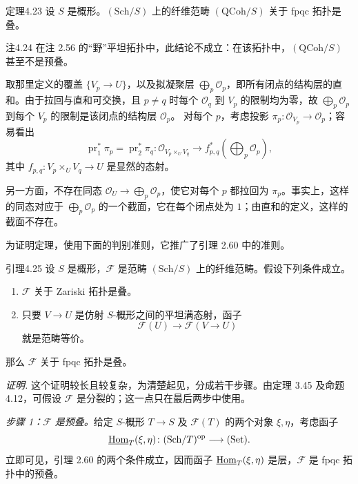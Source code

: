 \begin{origstatement}{定理}{4.23}\label{ch04:thm423}
设 $S$ 是概形。$(\mathrm{Sch}/S)$ 上的纤维范畴 $(\mathrm{QCoh}/S)$ 关于 fpqc 拓扑是叠。
\end{origstatement}

\begin{origstatement}{注}{4.24}\label{ch04:rem424}
在注 2.56 的“野”平坦拓扑中，此结论不成立：在该拓扑中，$(\mathrm{QCoh}/S)$ 甚至不是预叠。

取那里定义的覆盖 $\{V_p\to U\}$，以及拟凝聚层 $\bigoplus_p\mathcal O_p$，即所有闭点的结构层的直和。由于拉回与直和可交换，且 $p\ne q$ 时每个 $\mathcal O_q$ 到 $V_p$ 的限制均为零，故 $\bigoplus_p\mathcal O_p$ 到每个 $V_p$ 的限制是该闭点的结构层 $\mathcal O_p$。
对每个 $p$，考虑投影 $\pi_p\colon\mathcal O_{V_p}\to\mathcal O_p$；容易看出
\[
 \operatorname{pr}_1^*\pi_p=\operatorname{pr}_2^*\pi_q
 \colon\mathcal O_{V_p\times_U V_q}\longrightarrow f_{p,q}^*(\bigoplus_p\mathcal O_p),
\]
其中 $f_{p,q}\colon V_p\times_U V_q\to U$ 是显然的态射。

另一方面，不存在同态 $\mathcal O_U\to\bigoplus_p\mathcal O_p$，使它对每个 $p$ 都拉回为 $\pi_p$。事实上，这样的同态对应于 $\bigoplus_p\mathcal O_p$ 的一个截面，它在每个闭点处为 $1$；由直和的定义，这样的截面不存在。
\end{origstatement}

为证明定理，使用下面的判别准则，它推广了引理 2.60 中的准则。

\begin{origstatement}{引理}{4.25}\label{ch04:lem425}
设 $S$ 是概形，$\mathcal F$ 是范畴 $(\mathrm{Sch}/S)$ 上的纤维范畴。假设下列条件成立。
\begin{enumerate}
 \item[(i)] $\mathcal F$ 关于 Zariski 拓扑是叠。
 \item[(ii)] 只要 $V\to U$ 是仿射 $S$-概形之间的平坦满态射，函子
\[
 \mathcal F(U)\longrightarrow\mathcal F(V\to U)
\]
就是范畴等价。
\end{enumerate}
那么 $\mathcal F$ 关于 fpqc 拓扑是叠。
\end{origstatement}
\noindent\textit{证明.}
这个证明较长且较复杂，为清楚起见，分成若干步骤。由定理 3.45 及命题 4.12，可假设 $\mathcal F$ 是分裂的；这一点只在最后两步中使用。

\emph{步骤 1：$\mathcal F$ 是预叠。}给定 $S$-概形 $T\to S$ 及 $\mathcal F(T)$ 的两个对象 $\xi,\eta$，考虑函子
\[
 \underline{\operatorname{Hom}}_T(\xi,\eta)\colon(\mathrm{Sch}/T)^{\mathrm{op}}\longrightarrow(\mathrm{Set}).
\]
立即可见，引理 2.60 的两个条件成立，因而函子 $\underline{\operatorname{Hom}}_T(\xi,\eta)$ 是层，$\mathcal F$ 是 fpqc 拓扑中的预叠。

